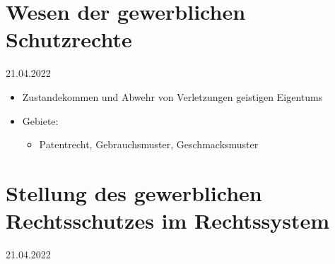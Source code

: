 \documentclass{report}
\begin{document}
\section{Wesen der gewerblichen Schutzrechte}
21.04.2022
\begin{itemize}
	\item Zustandekommen und Abwehr von Verletzungen geistigen Eigentums
	\item Gebiete:
	\begin{itemize}
		\item Patentrecht, Gebrauchsmuster, Geschmacksmuster
	\end{itemize}
\end{itemize}

\section{Stellung des gewerblichen Rechtsschutzes im Rechtssystem}
21.04.2022
\end{document}
